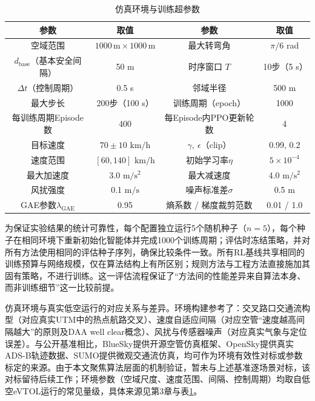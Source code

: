 \documentclass[12pt,a4paper,UTF8]{ctexart}
\begin{document}
\begin{table}[H]
    \centering\small
    \caption{仿真环境与训练超参数}
    \label{tab:env}
    \begin{tabular}{cccc}
        \toprule
        \textbf{参数} & \textbf{取值} & \textbf{参数} & \textbf{取值} \\
        \midrule
        空域范围 & $1000\,\mathrm{m}\times1000\,\mathrm{m}$ & 最大转弯角 & $\pi/6$ rad \\
        $d_{\text{base}}$（基本安全间隔） & 50 m & 时序窗口 $T$ & 10步（5 s） \\
        $\Delta t$（控制周期） & 0.5 s & 邻域半径 & 500 m \\
        最大步长 & 200步（100 s） & 训练周期（epoch） & 1000 \\
        每训练周期Episode数 & 400 & 每Episode内PPO更新轮数 & 4 \\
        目标速度 & $70\pm10$ $\mathrm{km/h}$ & $\gamma,\ \epsilon$（clip） & 0.99, 0.2 \\
        速度范围 & $[60, 140]$ $\mathrm{km/h}$ & 初始学习率$\eta$ & $5\times10^{-4}$ \\
        最大加速度 & 3.0 $\mathrm{m/s^2}$ & 最大减速度 & 4.0 $\mathrm{m/s^2}$ \\
        风扰强度 & 0.1 $\mathrm{m/s}$ & 噪声标准差$\sigma$ & 0.5 m \\
        GAE参数$\lambda_{\text{GAE}}$ & 0.95 & 熵系数 / 梯度裁剪范数 & 0.01 / 1.0 \\
        \bottomrule
    \end{tabular}
\end{table}

为保证实验结果的统计可靠性，每个配置独立运行5个随机种子（$n=5$），每个种子在相同环境下重新初始化智能体并完成1000个训练周期；评估时冻结策略，并对所有方法使用相同的评估种子序列，确保比较条件一致。所有RL基线共享相同的训练预算与网络规模，仅在算法结构上有所区别；规则方法与工程方法直接施加其固有策略，不进行训练。这一评估流程保证了“方法间的性能差异来自算法本身、而非训练细节”这一比较前提。

仿真环境与真实低空运行的对应关系与差异。环境构建参考了：交叉路口交通流构型（对应真实UTM中的热点航路交叉）、速度自适应间隔（对应空管“速度越高间隔越大”的原则及DAA well clear概念）、风扰与传感器噪声（对应真实气象与定位误差）。与公开基准相比，BlueSky\cite{ref52}提供开源空管仿真框架、OpenSky\cite{ref53}提供真实ADS-B轨迹数据、SUMO\cite{ref54}提供微观交通流仿真，均可作为环境有效性对标或参数标定的来源。由于本文聚焦算法层面的机制验证，暂未与上述基准逐场景对标，该对标留待后续工作；环境参数（空域尺度、速度范围、间隔、控制周期）均取自低空eVTOL运行的常见量级，具体来源见第3章与表\ref{tab:env}。
\end{document}
